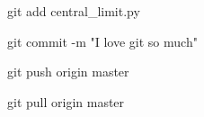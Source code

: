 git add central_limit.py

git commit -m "I love git so much"

git push origin master

git pull origin master

